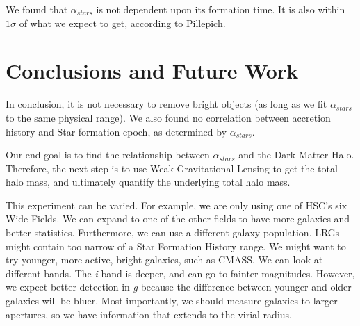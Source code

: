 \documentclass[apj]{emulateapj}
\begin{document}
We found that  $\alpha_{stars}$ is not dependent upon its formation time. It is also within $1\sigma$ of what we expect to get, according to Pillepich. 


\section{Conclusions and Future Work}

In conclusion, it is not necessary to remove bright objects (as long as we fit $\alpha_{stars}$ to the same physical range). We also found no correlation between accretion history and Star formation epoch, as determined by $\alpha_{stars}$. 

Our end goal is to find the relationship between $\alpha_{stars}$ and the Dark Matter Halo. Therefore, the next step is to use Weak Gravitational Lensing to get the total halo mass, and ultimately quantify the underlying total halo mass. 

This experiment can be varied. For example, we are only using one of HSC's six Wide Fields. We can expand to one of the other fields to have more galaxies and better statistics. Furthermore, we can use a different galaxy population. LRGs might contain too narrow of a Star Formation History range. We might want to try younger, more active, bright galaxies, such as CMASS. We can look at different bands. The \textit{i} band is deeper, and can go to fainter magnitudes. However, we expect better detection in \textit{g} because the difference between younger and older galaxies will be bluer. Most importantly, we should measure galaxies to larger apertures, so we have information that extends to the virial radius.

\clearpage


\nocite{*}
\end{document}
